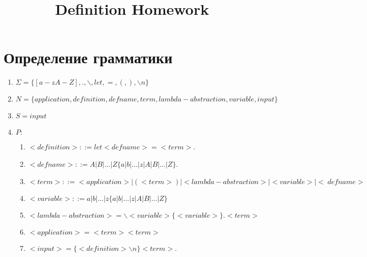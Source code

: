 \documentclass[12pt]{article}
\title{Definition Homework}
\begin{document}
\indent   
\section{Определение грамматики}
\begin{enumerate} 
    \item $\Sigma = \{[a-zA-Z],.,\backslash, let, =, (, ),\backslash n\}$
    \item $N = \{application, definition, defname, term, lambda-abstraction, variable, input\}$
    \item $S = input$
    \item $P:$ 
        \begin{enumerate} [1)]
            \item $<definition> ::= let <defname> = <term>$.
            \item $<defname> ::= A | B | ... | Z  \{a | b | ... | z | A | B | ... | Z \}$.
            \item $<term> ::= <application> | (<term>) | <lambda-abstraction> | <variable> | <~defname>$
            \item $<variable> ::= a | b | ... | z \{a | b | ... | z | A | B | ... | Z \}$
            \item $<lambda-abstraction> = \backslash<variable>\{<variable>\}.<term>$
            \item $<application> = <term> <term>$
            \item $<input> = \{<definition> \backslash n\} <term>$.
        \end{enumerate}
\end{enumerate}
\end{document}
